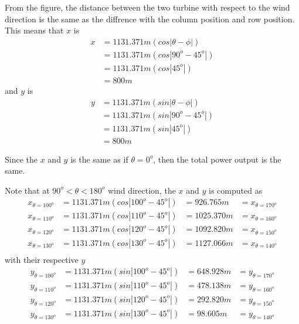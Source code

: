     
    
    
    From the figure, the distance between the two turbine with respect to the wind direction is the same as the diffrence with the column position and row position. This means that $x$ is
    	\begin{align*}
    		x &= 1131.371m(cos|\theta-\phi|) \\
    		  &= 1131.371m(cos|90^{o}-45^{o}|) \\
    		  &= 1131.371m(cos|45^{o}|) \\
    		  &= 800m	
    	\end{align*}
    and $y$ is 
    	\begin{align*}
    		y &= 1131.371m(sin|\theta-\phi|) \\
    		  &= 1131.371m(sin|90^{o}-45^{o}|) \\
    		  &= 1131.371m(sin|45^{o}|) \\
    		  &= 800m	
    	\end{align*}
    
    Since the $x$ and $y$ is the same as if $\theta=0^{o}$, then the total power output is the same.
    
    
    Note that at $90^{o}<\theta<180^{o}$ wind direction, the $x$ and $y$ is computed as 
    	\begin{align*}
    		x_{\theta=100^{o}} &= 1131.371m(cos|100^{o}-45^{o}|) &= 926.765m &= x_{\theta=170^{o}} \\
    	 	x_{\theta=110^{o}} &= 1131.371m(cos|110^{o}-45^{o}|) &= 1025.370m &= x_{\theta=160^{o}} \\
    		x_{\theta=120^{o}} &= 1131.371m(cos|120^{o}-45^{o}|) &= 1092.820m &= x_{\theta=150^{o}} \\
    		x_{\theta=130^{o}} &= 1131.371m(cos|130^{o}-45^{o}|) &= 1127.066m &= x_{\theta=140^{o}} \\
    	\end{align*}
    with their respective $y$ 
    	\begin{align*}
    		y_{\theta=100^{o}} &= 1131.371m(sin|100^{o}-45^{o}|) &= 648.928m &= y_{\theta=170^{o}} \\
    	 	y_{\theta=110^{o}} &= 1131.371m(sin|110^{o}-45^{o}|) &= 478.138m &= y_{\theta=160^{o}} \\
    		y_{\theta=120^{o}} &= 1131.371m(sin|120^{o}-45^{o}|) &= 292.820m &= y_{\theta=150^{o}} \\
    		y_{\theta=130^{o}} &= 1131.371m(sin|130^{o}-45^{o}|) &=  98.605m &= y_{\theta=140^{o}} 
    	\end{align*}
    
